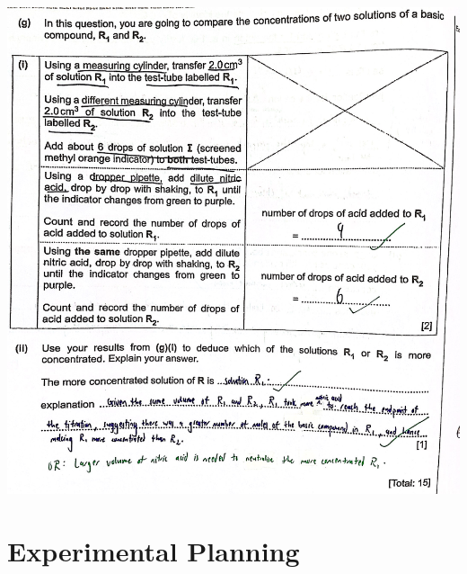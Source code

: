 \documentclass[oneside]{book}
\begin{document}
\begin{center}
        \includegraphics[width=\textwidth,height=\textheight,keepaspectratio]{images/91E14B8E-C349-48B7-9B06-51EA888F843D.jpeg}
    \end{center}
\section{Experimental Planning}
\end{document}
